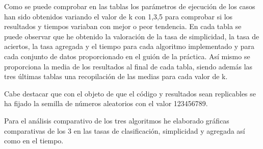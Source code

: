 \documentclass[12pt,a4paper]{article}
\begin{document}
	\begin{table}[h!]
		\centering
		\label{tablaGlobalK5}
		\caption{Resultados globales con K=5}
	\end{table}
	
	
	Como se puede comprobar en las tablas los parámetros de ejecución de los casos han sido obtenidos variando el valor de k con 1,3,5 para comprobar si los resultados y tiempos variaban con mejor o peor tendencia. En cada tabla se puede observar que he obtenido la valoración de la tasa de simplicidad, la tasa de aciertos, la tasa agregada y el tiempo para cada algoritmo implementado y para cada conjunto de datos proporcionado en el guión de la práctica. Así mismo se proporciona la media de los resultados al final de cada tabla, siendo además las tres últimas tablas una recopilación de las medias para cada valor de k.

	Cabe destacar que con el objeto de que el código y resultados sean replicables se ha fijado la semilla de números aleatorios con el valor 123456789.
	
	Para el análisis comparativo de los tres algoritmos he elaborado gráficas comparativas de los 3 en las tasas de clasificación, simplicidad y agregada así como en el tiempo.
	
\end{document}
